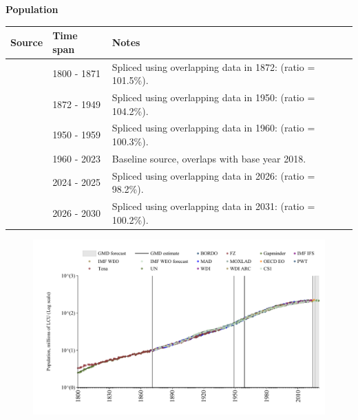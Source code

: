 \documentclass[12pt,a4paper,landscape]{article}
\begin{document}
\begin{adjustbox}{max totalsize={\paperwidth}{\paperheight},center}
\begin{minipage}[t][\textheight][t]{\textwidth}
\vspace*{0.5cm}
{}
\begin{center}
{\Large\bfseries Population}
\end{center}
\vspace{0.5cm}
\begin{table}[H]
\centering
\small
\begin{tabular}{|l|l|l|}
\hline
\textbf{Source} & \textbf{Time span} & \textbf{Notes} \\
\hline
\rowcolor{white}\cite{Gapminder}& 1800 - 1871 &Spliced using overlapping data in 1872: (ratio = 101.5\%). \\
\rowcolor{lightgray}\cite{CS1_BRA}& 1872 - 1949 &Spliced using overlapping data in 1950: (ratio = 104.2\%). \\
\rowcolor{white}\cite{IMF_IFS}& 1950 - 1959 &Spliced using overlapping data in 1960: (ratio = 100.3\%). \\
\rowcolor{lightgray}\cite{WDI}& 1960 - 2023 &Baseline source, overlaps with base year 2018. \\
\rowcolor{white}\cite{OECD_EO}& 2024 - 2025 &Spliced using overlapping data in 2026: (ratio = 98.2\%). \\
\rowcolor{lightgray}\cite{Gapminder}& 2026 - 2030 &Spliced using overlapping data in 2031: (ratio = 100.2\%). \\
\hline
\end{tabular}
\end{table}
\begin{figure}[H]
\centering
\includegraphics[width=\textwidth,height=0.6\textheight,keepaspectratio]{graphs/BRA_pop.pdf}
\end{figure}
\end{minipage}
\end{adjustbox}
\end{document}
